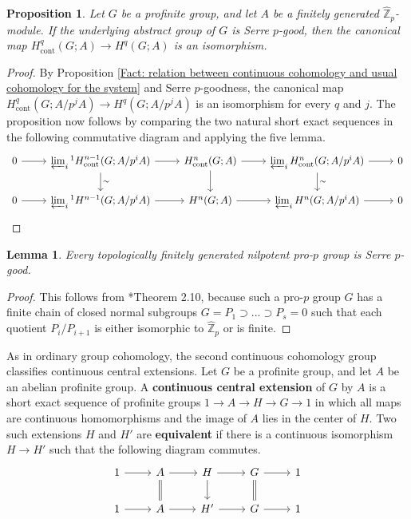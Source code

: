 \documentclass[11pt]{amsart}
\newtheorem{proposition}[theorem]{Proposition}
\newtheorem{lemma}[theorem]{Lemma}
\theoremstyle{definition}
\numberwithin{equation}{section}
\numberwithin{equation}{section}
\newcommand\ZZ{\mathbb{Z}}
\DeclareMathOperator{\cont}{cont}
\begin{document}
\begin{proposition}\label{Prop: comparison between continuous and discrete cohomology for Serre good groups}
Let $G$ be a profinite group, and let $A$ be a finitely generated $\widehat{\ZZ}_p$-module. If the underlying abstract group of $G$ is Serre $p$-good, then the canonical map $H^q_{\cont}(G;A)\rightarrow H^q(G;A)$ is an isomorphism.
\end{proposition}

\begin{proof}
By Proposition \ref{Fact: relation between continuous cohomology and usual cohomology for the system} and Serre $p$-goodness, the canonical map $H^q_{\cont}(G;A/p^jA)\rightarrow H^q(G;A/p^jA)$ is an isomorphism for every $q$ and $j$. The proposition now follows by comparing the two natural short exact sequences in the following commutative diagram and applying the five lemma.
\[
\begin{tikzcd}
0 \arrow[r]  & \varprojlim_i{}^1H^{n-1}_{\cont}(G;A/p^iA) \arrow[r] \arrow[d,"\sim"] & H_{\cont}^{n}(G;A) \arrow[r] \arrow[d] & \varprojlim_i H^{n}_{\cont}(G;A/p^iA) \arrow[r] \arrow[d,"\sim"] & 0    \\
0 \arrow[r]  & \varprojlim_i{}^1H^{n-1}(G;A/p^iA) \arrow[r]  & H^{n}(G;A) \arrow[r] & \varprojlim_i H^{n}(G;A/p^iA) \arrow[r] & 0 
\end{tikzcd}
\]
\end{proof}

\begin{lemma}\label{Lem: relation between continuous and discrete cohomology for nilpotent pro-p groups}
Every topologically finitely generated nilpotent pro-$p$ group is Serre $p$-good.
\end{lemma}

\begin{proof}
This follows from \cite{MFernandez-Alcober-Kazachkov-Remeslennikov-Symonds-comparison-discrete-continuous-cohomology-pro-p-groups}*{Theorem 2.10}, because such a pro-$p$ group $G$ has a finite chain of closed normal subgroups $G=P_1\supset ... \supset P_s=0$ such that each quotient $P_i/P_{i+1}$ is either isomorphic to $\widehat{\ZZ}_p$ or is finite.
\end{proof}

As in ordinary group cohomology,
the second continuous cohomology group classifies continuous central extensions. Let $G$ be a profinite group, and let $A$ be an abelian profinite group. A \textbf{continuous central extension} of $G$ by $A$ is a short exact sequence of profinite groups $1\rightarrow A\rightarrow H\rightarrow G\rightarrow 1$ in which all maps are continuous homomorphisms and the image of $A$ lies in the center of $H$. Two such extensions $H$ and $H'$ are \textbf{equivalent} if there is a continuous isomorphism $H\rightarrow H'$ such that the following diagram commutes.
\[
\begin{tikzcd}
 1 \arrow[r] & A \arrow[r] \arrow[d,equal] & H \arrow[r] \arrow[d] & G \arrow[r] \arrow[d,equal] & 1 \\
1 \arrow[r] & A \arrow[r] & H' \arrow[r] & G \arrow[r] & 1   
\end{tikzcd}
\]
\end{document}
